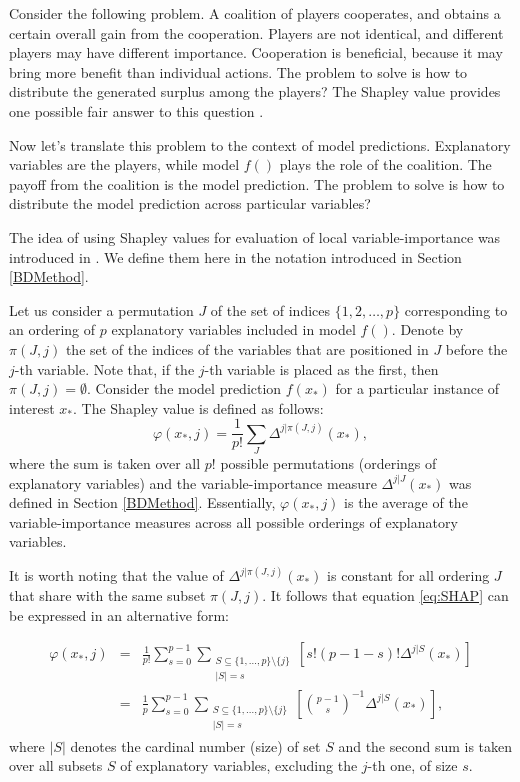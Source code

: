 \documentclass[12pt,]{krantz}
\begin{document}
Consider the following problem. A coalition of players cooperates, and obtains a certain overall gain from the cooperation. Players are not identical, and different players may have different importance. Cooperation is beneficial, because it may bring more benefit than individual actions. The problem to solve is how to distribute the generated surplus among the players? The Shapley value provides one possible fair answer to this question \citep{shapleybook1952}.

Now let's translate this problem to the context of model predictions. Explanatory variables are the players, while model \(f()\) plays the role of the coalition. The payoff from the coalition is the model prediction. The problem to solve is how to distribute the model prediction across particular variables?

The idea of using Shapley values for evaluation of local variable-importance was introduced in \citep{imeJLMR}. We define them here in the notation introduced in Section \ref{BDMethod}.

Let us consider a permutation \(J\) of the set of indices \(\{1,2,\ldots,p\}\) corresponding to an ordering of \(p\) explanatory variables included in model \(f()\). Denote by \(\pi(J,j)\) the set of the indices of the variables that are positioned in \(J\) before the \(j\)-th variable. Note that, if the \(j\)-th variable is placed as the first, then \(\pi(J,j) = \emptyset\). Consider the model prediction \(f(x_*)\) for a particular instance of interest \(x_*\). The Shapley value is defined as follows:
\begin{equation}
\varphi(x_*,j) = \frac{1}{p!} \sum_{J} \Delta^{j|\pi(J,j)}(x_*),  
\label{eq:SHAP}
\end{equation}
where the sum is taken over all \(p!\) possible permutations (orderings of explanatory variables) and the variable-importance measure \(\Delta^{j|J}(x_*)\) was defined in Section \ref{BDMethod}. Essentially, \(\varphi(x_*,j)\) is the average of the variable-importance measures across all possible orderings of explanatory variables.

It is worth noting that the value of \(\Delta^{j|\pi(J,j)}(x_*)\) is constant for all ordering \(J\) that share with the same subset \(\pi(J,j)\). It follows that equation \eqref{eq:SHAP} can be expressed in an alternative form:

\begin{eqnarray}
\varphi(x_*,j) &=& \frac 1{p!}\sum_{s=0}^{p-1} \sum_{
\substack{
S \subseteq \{1,\dots,p\}\setminus \{j\} \\ |S|=s
}}  \left[s!(p-1-s)! \Delta^{j|S}(x_*)\right]\nonumber\\
&=&
\frac 1{p}\sum_{s=0}^{p-1} \sum_{
\substack{
S \subseteq \{1,\dots,p\}\setminus \{j\} \\ |S|=s
}}  \left[{{p-1}\choose{s}}^{-1} \Delta^{j|S}(x_*)\right],
\label{eq:SHAP1}
\end{eqnarray}
where \(|S|\) denotes the cardinal number (size) of set \(S\) and the second sum is taken over all subsets \(S\) of explanatory variables, excluding the \(j\)-th one, of size \(s\).
\end{document}
